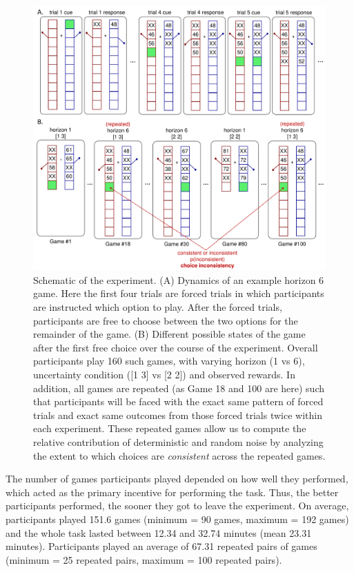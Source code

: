 \documentclass[12pt]{article}
\begin{document}
		\begin{figure}[hp]
		\begin{center}
			\includegraphics[width=\textwidth]{figures/taskfiga.pdf}
			\caption{ 
			Schematic of the experiment. (A) Dynamics of an example horizon 6 game.  Here the first four trials are forced trials in which participants are instructed which option to play.  After the forced trials, participants are free to choose between the two options for the remainder of the game.  (B) Different possible states of the game after the first free choice over the course of the experiment. Overall participants play 160 such games, with varying horizon (1 vs 6), uncertainty condition ([1 3] vs [2 2]) and observed rewards.  In addition, all games are repeated (as Game 18 and 100 are here) such that participants will be faced with the exact same pattern of forced trials and exact same outcomes from those forced trials twice within each experiment.  These repeated games allow us to compute the relative contribution of deterministic and random noise by analyzing the extent to which choices are {\em consistent} across the repeated games.}
			\label{fig:taskfig}
		\end{center}
	\end{figure}
	
	
	The number of games participants played depended on how well they performed, which acted as the primary incentive for performing the task. Thus, the better participants performed, the sooner they got to leave the experiment. On average, participants played 151.6 games (minimum = 90 games, maximum = 192 games) and the whole task lasted between 12.34 and 32.74 minutes (mean 23.31 minutes). Participants played an average of 67.31 repeated pairs of games (minimum = 25 repeated pairs, maximum =  100 repeated pairs).
	
\end{document}
